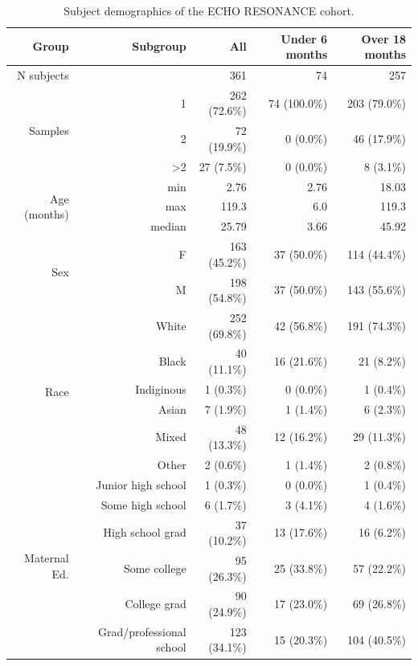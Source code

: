 \documentclass{article}
\begin{document}
\begin{table}[!htb]
    \centering
    \begin{tabular}{|r|r|r|r|r|}
      \hline\hline
      \textbf{Group} & \textbf{Subgroup} & \textbf{All} & \textbf{Under 6 months} & \textbf{Over 18 months} \\\hline
      N subjects &  & 361 & 74 & 257 \\  \hline
    \multirow{3}{*}{Samples} & 1 & 262 (72.6\%) & 74 (100.0\%) & 203 (79.0\%) \\ \cline{2-5}
         & 2 & 72 (19.9\%) & 0 (0.0\%) & 46 (17.9\%) \\ \cline{2-5}
         & \textgreater 2 & 27 (7.5\%) & 0 (0.0\%) & 8 (3.1\%) \\ \hline
    \multirow{3}{*}{Age (months)} & min & 2.76 & 2.76 & 18.03 \\ \cline{2-5}
         & max & 119.3 & 6.0 & 119.3 \\ \cline{2-5}
         & median & 25.79 & 3.66 & 45.92 \\ \hline
    \multirow{2}{*}{Sex} & F & 163 (45.2\%) & 37 (50.0\%) & 114 (44.4\%) \\   \cline{2-5}
                         & M & 198 (54.8\%) & 37 (50.0\%) & 143 (55.6\%) \\  \hline
    \multirow{6}{*}{Race} & White & 252 (69.8\%) & 42 (56.8\%) & 191 (74.3\%) \\   \cline{2-5}
        & Black & 40 (11.1\%) & 16 (21.6\%) & 21 (8.2\%) \\ \cline{2-5}
        & Indiginous & 1 (0.3\%) & 0 (0.0\%) & 1 (0.4\%) \\ \cline{2-5}
        & Asian & 7 (1.9\%) & 1 (1.4\%) & 6 (2.3\%) \\ \cline{2-5}
        & Mixed & 48 (13.3\%) & 12 (16.2\%) & 29 (11.3\%) \\ \cline{2-5}
        & Other & 2 (0.6\%) & 1 (1.4\%) & 2 (0.8\%) \\ \hline
    \multirow{6}{*}{Maternal Ed.} & Junior high school & 1 (0.3\%) & 0 (0.0\%) & 1 (0.4\%) \\   \cline{2-5}
        & Some high school & 6 (1.7\%) & 3 (4.1\%) & 4 (1.6\%) \\ \cline{2-5}
        & High school grad & 37 (10.2\%) & 13 (17.6\%) & 16 (6.2\%) \\ \cline{2-5}
        & Some college & 95 (26.3\%) & 25 (33.8\%) & 57 (22.2\%) \\ \cline{2-5}
        & College grad & 90 (24.9\%) & 17 (23.0\%) & 69 (26.8\%) \\ \cline{2-5}
        & Grad/professional school & 123 (34.1\%) & 15 (20.3\%) & 104 (40.5\%) \\\hline\hline
    \end{tabular}
    \caption{\label{tab:demo}Subject demographics of the ECHO RESONANCE cohort.}
\end{table}
\end{document}
